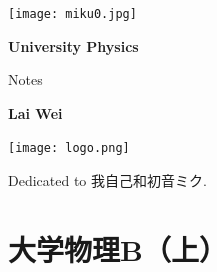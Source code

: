 \documentclass[
	12pt, %
	a4paper, %
]{myLegrandOrangeBook}
\begin{document}

\titlepage %
	{\texttt{[image: miku0.jpg]}} %
	{ %
		\centering\sffamily %
		{\Huge\bfseries University Physics\par} %
		\vspace{12pt} %
		{\LARGE Notes\par} %
		\vspace{20pt} %
		{\huge\bfseries Lai Wei\par} %
		\vspace{36pt} %
        {\texttt{[image: logo.png]}\par}
	}


    \begin{dedication}
        Dedicated to {\kaishu 我自己}和{\kaishu 初音ミク}.
    \end{dedication}


\pagestyle{empty} %

\tableofcontents %

\pagestyle{fancy} %

\cleardoublepage %


\part{大学物理B（上）}
\end{document}
